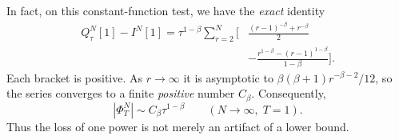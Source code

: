 \documentclass[11pt,a4paper]{amsart}
\theoremstyle{remark}
\theoremstyle{plain}
\theoremstyle{remark}
\numberwithin{equation}{section}
\begin{document}
In fact, on this constant-function test, we have the \emph{exact} identity
\begin{equation}\label{eq:vq-error-sum}
\begin{aligned}
 Q_\tau^N[1]-I^N[1]=\tau^{1-\beta}\sum_{r=2}^N\bigg[
 &\frac{(r-1)^{-\beta}+r^{-\beta}}2\\
 &-\frac{r^{1-\beta}-(r-1)^{1-\beta}}{1-\beta}
 \bigg].
\end{aligned}
\end{equation}
Each bracket is positive. As $r\to\infty$ it is asymptotic to
$\beta(\beta+1)r^{-\beta-2}/12$, so the series converges to a finite \emph{positive} number $C_\beta$. Consequently,
\begin{equation}\label{eq:vq-sharp-constant}
 |\Phi_T^N|\sim C_\beta\tau^{1-\beta}
 \qquad(N\to\infty,\;T=1).
\end{equation}
Thus the loss of one power is not merely an artifact of a lower bound.
\end{document}
